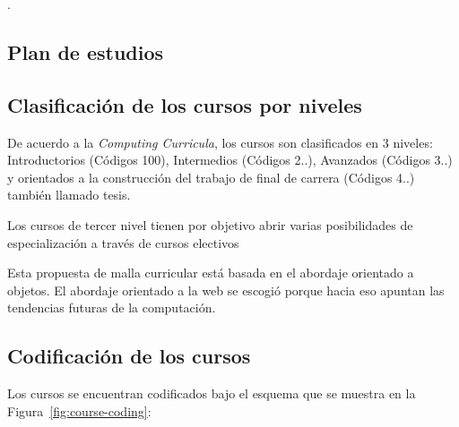 


 
				\newpage
				\newpage
 
\setcounter{page}{1}
\pagestyle{plain}
					\newpage 
	\newpage
 
\tableofcontents
\listoffigures
\listoftables
  
			\newpage
		\newpage
. \newpage
 
\begin{btUnit}
\pagestyle{plain}
\setcounter{page}{1}

%

%

% 
\chapter{Plan de estudios \YYYY}\label{chap:GeneralInfo} 

\section{Clasificación de los cursos por niveles}
De acuerdo a la \textit{Computing Curricula}, los cursos son clasificados en 3 niveles: Introductorios (Códigos 100), 
Intermedios  (Códigos 2..), Avanzados  (Códigos 3..) y orientados a la construcción del trabajo de final de carrera  (Códigos 4..) también llamado tesis.

Los cursos de tercer nivel tienen por objetivo abrir varias posibilidades de especialización a través de cursos electivos

Esta propuesta de malla curricular está basada en el abordaje orientado a objetos. 
El abordaje orientado a la web se escogió porque hacia eso apuntan las tendencias 
futuras de la computación.

\section{Codificación de los cursos}
Los cursos se encuentran codificados bajo el esquema que se muestra en la Figura~\ref{fig:course-coding}:


\end{btUnit}
